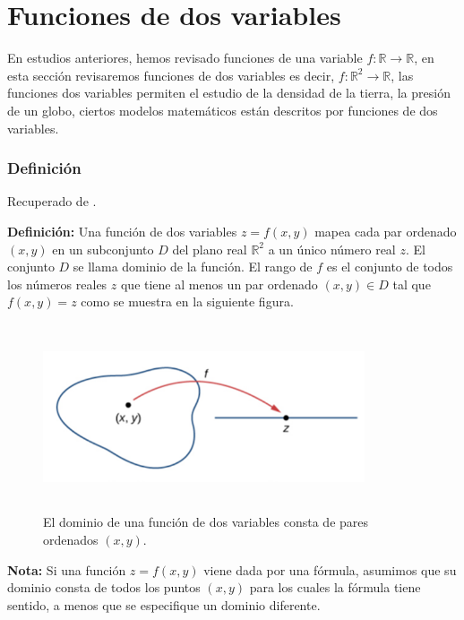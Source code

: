 \chapter{Funciones de dos variables}
En estudios anteriores, hemos revisado funciones de una variable $f: \mathbb{R} \rightarrow \mathbb{R}$,
en esta sección revisaremos funciones de dos variables es decir, $f: \mathbb{R}^{2} \rightarrow \mathbb{R}$,
las funciones dos variables permiten el estudio de la densidad de la tierra, la presión de un globo, ciertos modelos matemáticos están descritos por funciones de dos variables.\par
\subsection{Definición}
Recuperado de \cite{strang}.\par
\textbf{Definición:} Una función de dos variables $z=f(x, y)$ mapea cada par ordenado $(x, y)$ en un subconjunto $D$ del plano real $\mathbb{R}^{2}$ a un único número real $z$. El conjunto $D$ se llama dominio de la función. El rango de $f$ es el conjunto de todos los números reales $z$ que tiene al menos un par ordenado $(x, y) \in D$ tal que $f(x, y)=z$ como se muestra en la siguiente figura.\par
\begin{figure}[htpb]
    \includegraphics[width=9.5cm, height=5.5cm]{imagenes/NImagen1.png}
    \caption{El dominio de una función de dos variables consta de pares ordenados $(x, y)$.}
\end{figure}
\textbf{Nota:} Si una función $z=f(x, y)$ viene dada por una fórmula, asumimos que su dominio consta de todos los puntos $(x, y)$ para los cuales la fórmula tiene sentido, a menos que se especifique un dominio diferente.\par
